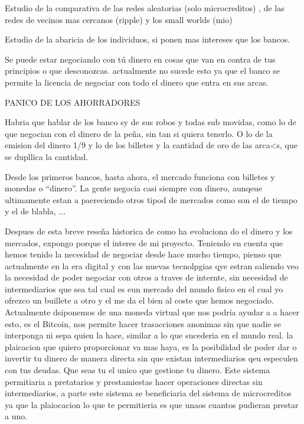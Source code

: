 Estudio de la comparativa de las redes aleatorias (solo microcreditos) , de las redes de vecinos mas cercanos (ripple) y los small worlds (mio)

Estudio de la abaricia de los individuos, si ponen mas intereses que los bancos.

Se puede estar negociando con tú dinero en cosas que van en contra de tus principios o que desconozcas. actualmente no sucede esto ya que el banco se permite la licencia de negociar con todo el dinero que entra en sus arcas.

PANICO DE LOS AHORRADORES

Habria que hablar de los banco sy de sus robos y todas sub movidas, como lo de que negocian con el dinero de la peña, sin tan si quiera tenerlo. O lo de la emision del dinero 1/9 y lo de los billetes y la cantidad de oro de las arca<s, que se dupllica la cantidad.

Desde los primeros bancos, hasta ahora, el mercado funciona con billetes y monedas o ``dinero''. La gente negocia casi siempre con dinero, aunqeue ultimamente estan a paereciendo otros tipod de mercados como son el de tiempo y el de blabla, ...


Despues de esta breve reseña historica de como ha evoluciona do el dinero y los mercados, expongo porque el interes de mi proyecto. Teniendo en cuenta que hemos tenido la necesidad de negociar desde hace mucho tiempo, pienso que actualmente en la era digital y con las nuevas tecnolpgias qye estran saliendo veo la necesidad de poder negociar con otros a traves de internte, sin necesidad de intermediarios que sea tal cual es eun mercado del mundo fisico en el cual yo ofrezco un buillete a otro y el me da el bien al coste que hemos negociado. Actualmente dsiponemos de una moneda virtual que nos podría ayudar a a hacer esto, es el Bitcoin, nos permite hacer trasacciones anonimas sin que nadie se interponga ni sepa quien la hace, similar a lo que sucederia en el mundo real. la plaicacion que quiero proporcionar va mas haya, es la posibilidad de poder dar o invertir tu dinero de manera directa sin que existan intermediarios qeu especulen con tus deudas. Que seas tu el unico que gestione tu dinero. Este sistema permitiaria a pretatarios y prestamiestas hacer operaciones directas sin intermediarios, a parte este sistema se beneficiaria del sistema de microcreditos ya que la plaiocacion lo que te permitieria es que unaos cuantos pudieran prestar a uno.


